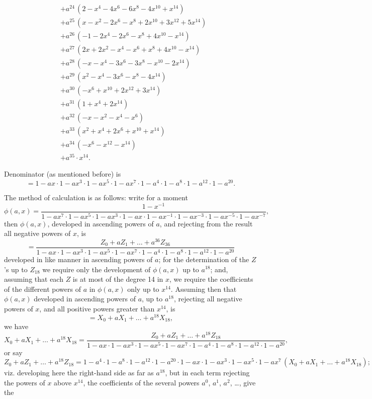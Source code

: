 \documentclass[11pt]{article}
\begin{document}
{\small
\begin{align*}
&+ a^{24}\,(2 - x^{4} - 4x^{6} - 6x^{8} - 4x^{10} + x^{14})\\
&+ a^{25}\,(x - x^{2} - 2x^{6} - x^{8} + 2x^{10} + 3x^{12} + 5x^{14})\\
&+ a^{26}\,(-1 - 2x^{4} - 2x^{6} - x^{8} + 4x^{10} - x^{14})\\
&+ a^{27}\,(2x + 2x^{2} - x^{4} - x^{6} + x^{8} + 4x^{10} - x^{14})\\
&+ a^{28}\,(-x - x^{4} - 3x^{6} - 3x^{8} - x^{10} - 2x^{14})\\
&+ a^{29}\,(x^{2} - x^{4} - 3x^{6} - x^{8} - 4x^{14})\\
&+ a^{30}\,(-x^{6} + x^{10} + 2x^{12} + 3x^{14})\\
&+ a^{31}\,(1 + x^{4} + 2x^{14})\\
&+ a^{32}\,(-x - x^{2} - x^{4} - x^{6})\\
&+ a^{33}\,(x^{2} + x^{4} + 2x^{6} + x^{10} + x^{14})\\
&+ a^{34}\,(-x^{6} - x^{12} - x^{14})\\
&+ a^{35} \cdot x^{14}.
\end{align*}
}

\noindent Denominator (as mentioned before) is
\[ = 1 - ax \cdot 1 - ax^{3}\cdot 1 - ax^{5}\cdot 1 - ax^{7}\cdot 1 - a^{4}\cdot 1 - a^{8}\cdot 1 - a^{12}\cdot 1 - a^{20}. \]

The method of calculation is as follows: write for a moment
\[ \phi(a, x) = \frac{1 - x^{-1}}{1 - ax^{7}\cdot 1 - ax^{5}\cdot 1 - ax^{3}\cdot 1 - ax\cdot 1 - ax^{-1}\cdot 1 - ax^{-3}\cdot 1 - ax^{-5}\cdot 1 - ax^{-7}}, \]
then $\phi(a, x)$, developed in ascending powers of $a$, and rejecting from the result all negative powers of $x$, is
\[ = \frac{Z_{0} + a Z_{1} + \dots + a^{36}Z_{36}}{1 - ax \cdot 1 - ax^{3}\cdot 1 - ax^{5}\cdot 1 - ax^{7}\cdot 1 - a^{4}\cdot 1 - a^{8}\cdot 1 - a^{12}\cdot 1 - a^{20}} \]
developed in like manner in ascending powers of $a$; for the determination of the $Z$'s up to $Z_{18}$ we require only the development of $\phi(a, x)$ up to $a^{18}$; and, assuming that each $Z$ is at most of the degree 14 in $x$, we require the coefficients of the different powers of $a$ in $\phi(a, x)$ only up to $x^{14}$. Assuming then that $\phi(a, x)$ developed in ascending powers of $a$, up to $a^{18}$, rejecting all negative powers of $x$, and all positive powers greater than $x^{14}$, is
\[ = X_{0} + a X_{1} + \dots + a^{18} X_{18}, \]
we have
\[ X_{0} + a X_{1} + \dots + a^{18} X_{18} = \frac{Z_{0} + a Z_{1} + \dots + a^{18} Z_{18}}{1 - ax \cdot 1 - ax^{3}\cdot 1 - ax^{5}\cdot 1 - ax^{7}\cdot 1 - a^{4}\cdot 1 - a^{8}\cdot 1 - a^{12}\cdot 1 - a^{20}}, \]
or say
\[ Z_{0} + a Z_{1} + \dots + a^{18} Z_{18} = 1 - a^{4}\cdot 1 - a^{8}\cdot 1 - a^{12}\cdot 1 - a^{20}\cdot 1 - ax\cdot 1 - ax^{3}\cdot 1 - ax^{5}\cdot 1 - ax^{7}\,(X_{0} + a X_{1} + \dots + a^{18} X_{18}); \]
viz. developing here the right-hand side as far as $a^{18}$, but in each term rejecting the powers of $x$ above $x^{14}$, the coefficients of the several powers $a^{0}$, $a^{1}$, $a^{2}$, \dots, give the
\end{document}
